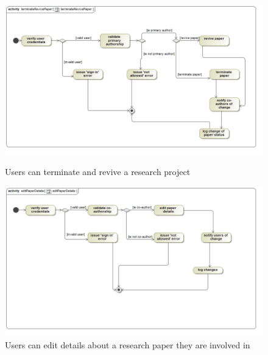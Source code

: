 \documentclass[a4paper,12pt]{report}
\begin{document}
\begin{figure}[ht]
\includegraphics[scale=0.5]{act__terminateRevivePaper__terminateRevivePaper.jpg} 
\caption{Users can terminate and revive a research project}


\includegraphics[scale=0.5]{act__editPaperDetails__editPaperDetails.jpg} 
\caption{Users can edit details about a research paper they are involved in}

\end{figure}
\newpage
\end{document}

